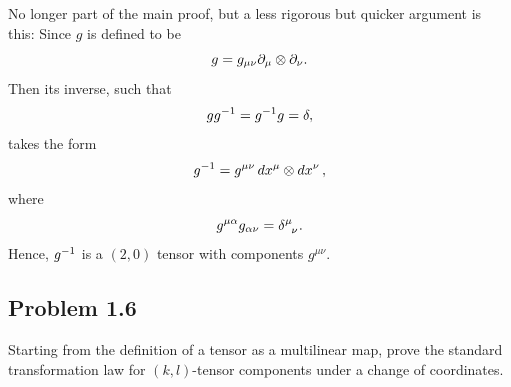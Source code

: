 \begin{solution_pset}
			No longer part of the main proof, but a less rigorous but quicker argument is this:
			Since $g$ is defined to be
			\[
				g = g_{\mu\nu}\partial_\mu \otimes \partial_\nu.
			\]
			Then its inverse, such that
			\[
				gg^{-1} = g^{-1} g = \delta,
			\]
			takes the form
			\[
				g^{-1} = g^{\mu\nu} \dd{x^\mu}\otimes \dd{x^\nu},
			\]
			where
			\[
				g^{\mu\alpha}g_{\alpha\nu} = \delta\indices{^\mu_\nu}.
			\]
			Hence, $g^{-1}$ is a $(2,0)$ tensor with components $g^{\mu\nu}$.
	\end{solution_pset}
	\newpage
	\subsection*{
		Problem 1.6
	}
	\begin{problem}
		Starting from the definition of a tensor as a multilinear map, prove the 
		standard transformation law for $(k,l)$-tensor components under a change of coordinates.
	\end{problem}
